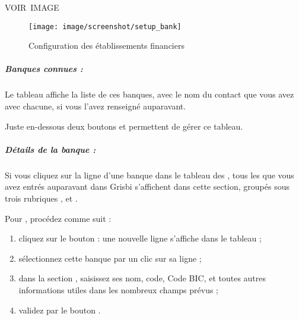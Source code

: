 VOIR IMAGE



\ifIllustration
\begin{figure}[ht!]
\begin{center}
\texttt{[image: image/screenshot/setup\_bank]}
\end{center}
\caption{Configuration des établissements financiers}
\label{setup-bank-img}
\end{figure}
\fi


\subparagraph{Banques connues :\label{setup-resources-banks-known}}


Le tableau affiche la liste de ces banques, avec le nom du contact que vous avez avec chacune, si vous l'avez renseigné auparavant. 


Juste en-dessous deux boutons  et  permettent de gérer ce tableau.

 


\subparagraph{Détails de la banque :\label{setup-resources-banks-details}}



Si vous cliquez sur la ligne d'une banque dans le tableau des , tous les  que vous avez entrés auparavant dans Grisbi s'affichent dans cette section, groupés sous trois rubriques ,  et .






Pour , procédez comme suit :

\begin{enumerate}
	\item cliquez sur le bouton  : une nouvelle ligne  s'affiche dans le tableau  ;
	\item sélectionnez cette banque par un clic sur sa ligne ;
	\item dans la section , saisissez ses nom, code, Code BIC, et toutes autres informations utiles dans les nombreux champs prévus ;
	\item validez par le bouton .
\end{enumerate}

